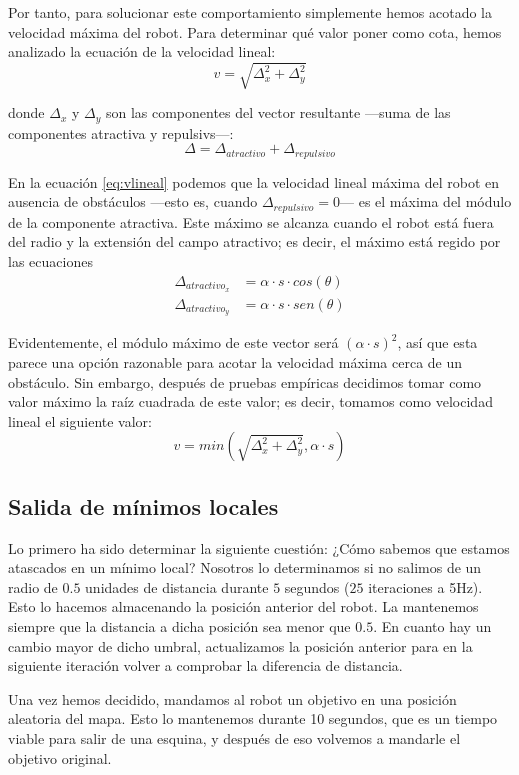 \documentclass[a4paper, 11pt, titlepage]{article}
\begin{document}
    Por tanto, para solucionar este comportamiento simplemente hemos acotado la velocidad máxima del robot. Para determinar qué valor poner como cota, hemos analizado la ecuación de la velocidad lineal:
    \begin{equation}
        v = \sqrt{\Delta_x^2 + \Delta_y^2}
        \label{eq:vlineal}
    \end{equation}

    donde $\Delta_x$ y $\Delta_y$ son las componentes del vector resultante ---suma de las componentes atractiva y repulsivs---:
    \[
    \Delta = \Delta_{atractivo} + \Delta_{repulsivo}
    \]

    En la ecuación \ref{eq:vlineal} podemos que la velocidad lineal máxima del robot en ausencia de obstáculos ---esto es, cuando $\Delta_{repulsivo} = 0$--- es el máxima del módulo de la componente atractiva. Este máximo se alcanza cuando el robot está fuera del radio y la extensión del campo atractivo; es decir, el máximo está regido por las ecuaciones
    \begin{align*}
        \Delta_{atractivo_x} &= \alpha \cdot s \cdot cos(\theta) \\
        \Delta_{atractivo_y} &= \alpha \cdot s \cdot sen(\theta)
    \end{align*}

    Evidentemente, el módulo máximo de este vector será $(\alpha \cdot s)^2$, así que esta parece una opción razonable para acotar la velocidad máxima cerca de un obstáculo. Sin embargo, después de pruebas empíricas decidimos tomar como valor máximo la raíz cuadrada de este valor; es decir, tomamos como velocidad lineal el siguiente valor:
    \[
    v = min(\sqrt{\Delta_x^2 + \Delta_y^2}, \alpha \cdot s)
    \]


  \subsection{Salida de mínimos locales}
    Lo primero ha sido determinar la siguiente cuestión: ¿Cómo sabemos que estamos atascados en un mínimo local? Nosotros lo determinamos si no salimos de un radio de $0.5$ unidades de distancia durante $5$ segundos ($25$ iteraciones a 5Hz). Esto lo hacemos almacenando la posición anterior del robot. La mantenemos siempre que la distancia a dicha posición sea menor que $0.5$. En cuanto hay un cambio mayor de dicho umbral, actualizamos la posición anterior para en la siguiente iteración volver a comprobar la diferencia de distancia.

    Una vez hemos decidido, mandamos al robot un objetivo en una posición aleatoria del mapa. Esto lo mantenemos durante 10 segundos, que es un tiempo viable para salir de una esquina, y después de eso volvemos a mandarle el objetivo original.
\end{document}
